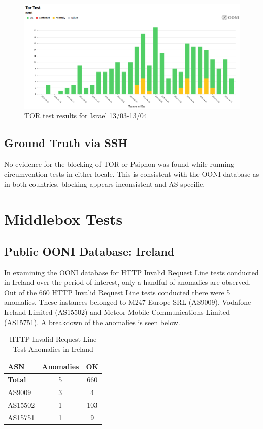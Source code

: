 \begin{figure} [H]
    \centering
    \includegraphics[width=0.5\linewidth]{ISROONITOR.png}
    \caption{TOR test results for Israel 13/03-13/04}
    \label{fig:enter-label}
\end{figure}

\subsection{Ground Truth via SSH}
No evidence for the blocking of TOR or Psiphon was found while running circumvention tests in either locale. This is consistent with the OONI database as in both countries, blocking appears inconsistent and AS specific.



\section{Middlebox Tests}
\subsection{Public OONI Database: Ireland}
In examining the OONI database for HTTP Invalid Request Line tests conducted in Ireland over the period of interest, only a handful of anomalies are observed. Out of the 660 HTTP Invalid Request Line tests conducted there were 5 anomalies. These instances belonged to M247 Europe SRL (AS9009), Vodafone Ireland Limited (AS15502) and Meteor Mobile Communications Limited (AS15751). A breakdown of the anomalies is seen below.

\begin{table}[H]
\centering
\caption{HTTP Invalid Request Line Test Anomalies in Ireland}
\begin{tabular}{lcc}
\toprule
\textbf{ASN} & \textbf{Anomalies} & \textbf{OK} \\
\midrule
\textbf{Total}   & 5 & 660 \\
\midrule
AS9009           & 3 & 4 \\
AS15502          & 1 & 103 \\
AS15751          & 1 & 9 \\
\bottomrule
\end{tabular}
\label{tab:http_invalid_ireland}
\end{table}



